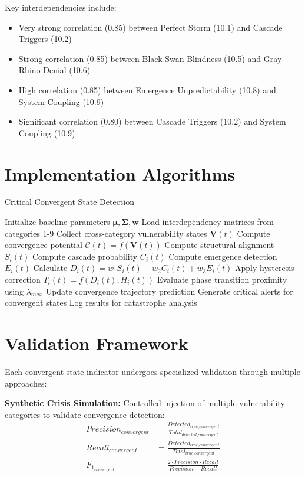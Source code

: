 \documentclass[11pt,a4paper]{article}
\begin{document}
Key interdependencies include:
\begin{itemize}
\item Very strong correlation (0.85) between Perfect Storm (10.1) and Cascade Triggers (10.2)
\item Strong correlation (0.85) between Black Swan Blindness (10.5) and Gray Rhino Denial (10.6)
\item High correlation (0.85) between Emergence Unpredictability (10.8) and System Coupling (10.9)
\item Significant correlation (0.80) between Cascade Triggers (10.2) and System Coupling (10.9)
\end{itemize}

\section{Implementation Algorithms}

\begin{algorithm}
\caption{Critical Convergent State Detection}
\begin{algorithmic}[1]
\STATE Initialize baseline parameters $\boldsymbol{\mu}, \boldsymbol{\Sigma}, \boldsymbol{w}$
\STATE Load interdependency matrices from categories 1-9
    \STATE Collect cross-category vulnerability states $\mathbf{V}(t)$
    \STATE Compute convergence potential $\mathcal{C}(t) = f(\mathbf{V}(t))$
        \STATE Compute structural alignment $S_i(t)$
        \STATE Compute cascade probability $C_i(t)$
        \STATE Compute emergence detection $E_i(t)$
        \STATE Calculate $D_i(t) = w_1 S_i(t) + w_2 C_i(t) + w_3 E_i(t)$
        \STATE Apply hysteresis correction $T_i(t) = f(D_i(t), H_i(t))$
    \ENDFOR
    \STATE Evaluate phase transition proximity using $\lambda_{max}$
    \STATE Update convergence trajectory prediction
    \STATE Generate critical alerts for convergent states
    \STATE Log results for catastrophe analysis
\ENDFOR
\end{algorithmic}
\end{algorithm}

\section{Validation Framework}

Each convergent state indicator undergoes specialized validation through multiple approaches:

\textbf{Synthetic Crisis Simulation:}
Controlled injection of multiple vulnerability categories to validate convergence detection:
\begin{align}
Precision_{convergent} &= \frac{Detected_{true\_convergent}}{Total_{detected\_convergent}} \\
Recall_{convergent} &= \frac{Detected_{true\_convergent}}{Total_{true\_convergent}} \\
F_{1_{convergent}} &= \frac{2 \cdot Precision \cdot Recall}{Precision + Recall}
\end{align}
\end{document}
